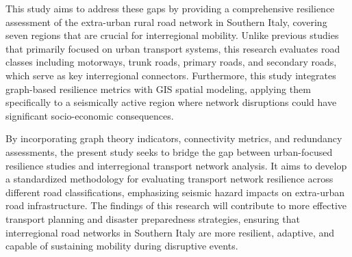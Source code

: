 This study aims to address these gaps by providing a comprehensive resilience assessment of the extra-urban rural road network in Southern Italy, covering seven regions that are crucial for interregional mobility. Unlike previous studies that primarily focused on urban transport systems, this research evaluates road classes including motorways, trunk roads, primary roads, and secondary roads, which serve as key interregional connectors. Furthermore, this study integrates graph-based resilience metrics with GIS spatial modeling, applying them specifically to a seismically active region where network disruptions could have significant socio-economic consequences.

By incorporating graph theory indicators, connectivity metrics, and redundancy assessments, the present study seeks to bridge the gap between urban-focused resilience studies and interregional transport network analysis. It aims to develop a standardized methodology for evaluating transport network resilience across different road classifications, emphasizing seismic hazard impacts on extra-urban road infrastructure. The findings of this research will contribute to more effective transport planning and disaster preparedness strategies, ensuring that interregional road networks in Southern Italy are more resilient, adaptive, and capable of sustaining mobility during disruptive events.
